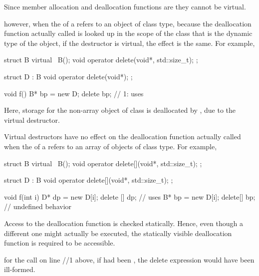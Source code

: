 \pnum
Since member allocation and deallocation functions are
they cannot be virtual.
\begin{note}
%
%
however, when the
of a
refers to an object of class type,
because the deallocation function actually called is looked up in the scope of
the class that is the dynamic type of the object,
if the destructor is virtual, the effect is the same.
For example,

\begin{codeblock}
struct B {
  virtual ~B();
  void operator delete(void*, std::size_t);
};

struct D : B {
  void operator delete(void*);
};

void f() {
  B* bp = new D;
  delete bp;        // 1: uses 
}
\end{codeblock}

Here, storage for the non-array object of class
is deallocated by
,
due to the virtual destructor.
\end{note}
\begin{note}
Virtual destructors have no effect on the deallocation function actually
called when the
of a
refers to an array of objects of class type.
For example,

\begin{codeblock}
struct B {
  virtual ~B();
  void operator delete[](void*, std::size_t);
};

struct D : B {
  void operator delete[](void*, std::size_t);
};

void f(int i) {
  D* dp = new D[i];
  delete [] dp;     // uses 
  B* bp = new D[i];
  delete[] bp;      // undefined behavior
}
\end{codeblock}
\end{note}

\pnum
Access to the deallocation function is checked statically.
Hence, even though a different one might actually be executed,
the statically visible deallocation function is required to be accessible.
\begin{example}
for the call on line //1 above,
if
had been
,
the delete expression would have been ill-formed.
\end{example}

